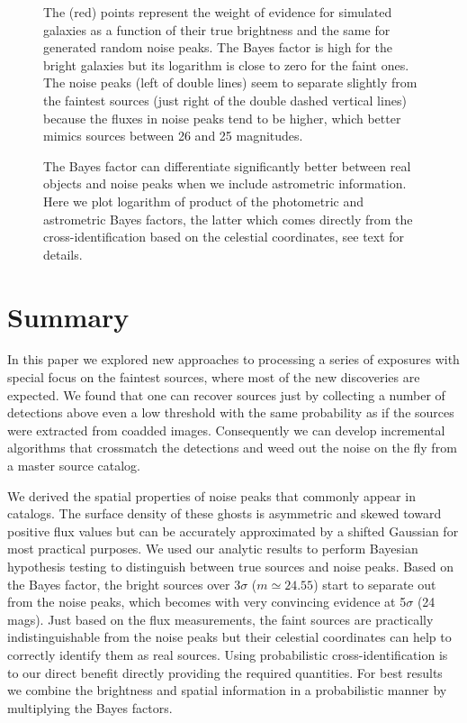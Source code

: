 \documentclass[twocolumn]{emulateapj}
\begin{document}
\begin{figure}
\caption{The (red) points represent the weight of evidence for simulated galaxies as a function of their true brightness and the same for generated random noise peaks. The Bayes factor is high for the bright galaxies but its logarithm is close to zero for the faint ones. The noise peaks (left of double lines) seem to separate slightly from the faintest sources (just right of the double dashed vertical lines) because the fluxes in noise peaks tend to be higher, which better mimics sources between 26 and 25 magnitudes.}
\label{fig:bf}
\end{figure}

\begin{figure}
\caption{The Bayes factor can differentiate significantly better between real objects and noise peaks when we include astrometric information. Here we plot logarithm of product of the photometric and astrometric Bayes factors, the latter which comes directly from the cross-identification based on the celestial coordinates, see text for details.}
\label{fig:bf2}
\end{figure}






\section{Summary}
\label{sec:sum}
\noindent
In this paper we explored new approaches to processing a series of exposures with special focus on the faintest sources, where most of the new discoveries are expected.
%
We found that one can recover sources just by collecting a number of detections above even a low threshold with the same probability as if the sources were extracted from coadded images. Consequently we can develop incremental algorithms that crossmatch the detections and weed out the noise on the fly from a master source catalog.

We derived the spatial properties of noise peaks that commonly appear in catalogs. The surface density of these ghosts is asymmetric and skewed toward positive flux values but can be accurately approximated by a shifted Gaussian for most practical purposes. We used our analytic results to perform Bayesian hypothesis testing to distinguish between true sources and noise peaks.
%
Based on the Bayes factor, the bright sources over \mbox{3$\sigma$} \mbox{($m\!\simeq\!24.55$)} start to separate out from the noise peaks, which becomes with very convincing evidence at \mbox{5$\sigma$} (24 mags).
%
Just based on the flux measurements, the faint sources are practically indistinguishable from the noise peaks but their celestial coordinates can help to correctly identify them as real sources. Using probabilistic cross-identification is to our direct benefit directly providing the required quantities. For best results we combine the brightness and spatial information in a probabilistic manner by multiplying the Bayes factors.
\end{document}
